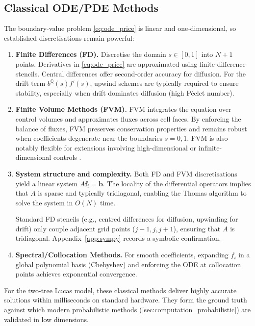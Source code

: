 ﻿\documentclass[11pt,letterpaper,oneside]{article}
\numberwithin{equation}{section}
\newcommand{\1}{\mathbf{1}}
\begin{document}
\subsection{Classical ODE/PDE Methods}\label{sec:computation_classical}
The boundary-value problem \eqref{eq:ode_price} is linear and one-dimensional, so established discretisations remain powerful:
\begin{enumerate}[leftmargin=1.25em]
  \item \textbf{Finite Differences (FD).} Discretise the domain $s\in[0,1]$ into $N+1$ points. Derivatives in \cref{eq:ode_price} are approximated using finite-difference stencils. Central differences offer second-order accuracy for diffusion. For the drift term $b^{\mathbb{Q}}(s) f'(s)$, upwind schemes are typically required to ensure stability, especially when drift dominates diffusion (high P\'eclet number).
  \item \textbf{Finite Volume Methods (FVM).} FVM integrates the equation over control volumes and approximates fluxes across cell faces. By enforcing the balance of fluxes, FVM preserves conservation properties and remains robust when coefficients degenerate near the boundaries $s=0,1$. FVM is also notably flexible for extensions involving high-dimensional or infinite-dimensional controls \cite{chen2025applications}.
  \item \textbf{System structure and complexity.} Both FD and FVM discretisations yield a linear system $A\bm{f}_i=\bm{b}$. The locality of the differential operators implies that $A$ is sparse and typically tridiagonal, enabling the Thomas algorithm to solve the system in $O(N)$ time.
  \begin{sympycheck}[title={Verification: Tridiagonal structure from 1D discretisation}]
  \small Standard FD stencils (e.g., centred differences for diffusion, upwinding for drift) only couple adjacent grid points ($j-1, j, j+1$), ensuring that $A$ is tridiagonal. Appendix~\ref{app:sympy} records a symbolic confirmation.
  \end{sympycheck}
  \item \textbf{Spectral/Collocation Methods.} For smooth coefficients, expanding $f_i$ in a global polynomial basis (Chebyshev) and enforcing the ODE at collocation points achieves exponential convergence.
\end{enumerate}
\begin{tcolorbox}[didacticstyle, title={Computational benchmark}]
For the two-tree Lucas model, these classical methods deliver highly accurate solutions within milliseconds on standard hardware. They form the ground truth against which modern probabilistic methods (\cref{sec:computation_probabilistic}) are validated in low dimensions.
\end{tcolorbox}
\end{document}
